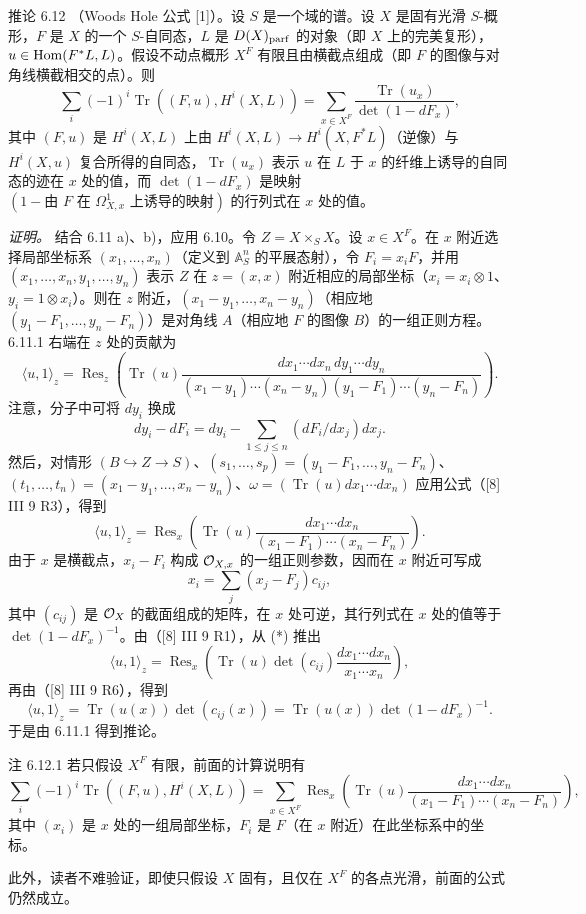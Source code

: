 \begin{statement}{推论 6.12}
（Woods Hole 公式 [1]）。设 $S$ 是一个域的谱。设 $X$ 是固有光滑 $S$-概形，$F$ 是 $X$ 的一个 $S$-自同态，$L$ 是 $D(X)_{\mathrm{parf}}$ 的对象（即 $X$ 上的完美复形），$u\in\operatorname{Hom}(F^*L,L)$。假设不动点概形 $X^F$ 有限且由横截点组成（即 $F$ 的图像与对角线横截相交的点）。则
\[
\sum_i(-1)^i\operatorname{Tr}((F,u),H^i(X,L))=
\sum_{x\in X^F}\frac{\operatorname{Tr}(u_x)}{\det(1-dF_x)},
\]
其中 $(F,u)$ 是 $H^i(X,L)$ 上由 $H^i(X,L)\to H^i(X,F^*L)$（逆像）与 $H^i(X,u)$ 复合所得的自同态，$\operatorname{Tr}(u_x)$ 表示 $u$ 在 $L$ 于 $x$ 的纤维上诱导的自同态的迹在 $x$ 处的值，而 $\det(1-dF_x)$ 是映射 $(1-\text{由 }F\text{ 在 }\Omega^1_{X,x}\text{ 上诱导的映射})$ 的行列式在 $x$ 处的值。

\emph{证明。} 结合 6.11 a)、b)，应用 6.10。令 $Z=X\times_S X$。设 $x\in X^F$。在 $x$ 附近选择局部坐标系 $(x_1,\ldots,x_n)$（定义到 $\mathbb A_S^n$ 的平展态射），令 $F_i=x_iF$，并用 $(x_1,\ldots,x_n,y_1,\ldots,y_n)$ 表示 $Z$ 在 $z=(x,x)$ 附近相应的局部坐标（$x_i=x_i\otimes1$、$y_i=1\otimes x_i$）。则在 $z$ 附近，$(x_1-y_1,\ldots,x_n-y_n)$（相应地 $(y_1-F_1,\ldots,y_n-F_n)$）是对角线 $A$（相应地 $F$ 的图像 $B$）的一组正则方程。6.11.1 右端在 $z$ 处的贡献为
\[
\langle u,1\rangle_z=
\operatorname{Res}_z\left(\operatorname{Tr}(u)\frac{dx_1\cdots dx_n\,dy_1\cdots dy_n}{(x_1-y_1)\cdots(x_n-y_n)(y_1-F_1)\cdots(y_n-F_n)}\right).
\]
注意，分子中可将 $dy_i$ 换成
\[
dy_i-dF_i=dy_i-\sum_{1\le j\le n}(dF_i/dx_j)dx_j.
\]
然后，对情形 $(B\hookrightarrow Z\to S)$、$(s_1,\ldots,s_p)=(y_1-F_1,\ldots,y_n-F_n)$、$(t_1,\ldots,t_n)=(x_1-y_1,\ldots,x_n-y_n)$、$\omega=(\operatorname{Tr}(u)dx_1\cdots dx_n)$ 应用公式（[8] III 9 R3），得到
\begin{equation}
\tag{*}
\langle u,1\rangle_z=
\operatorname{Res}_x\left(\operatorname{Tr}(u)\frac{dx_1\cdots dx_n}{(x_1-F_1)\cdots(x_n-F_n)}\right).
\end{equation}
由于 $x$ 是横截点，$x_i-F_i$ 构成 $\mathcal{O}_{X,x}$ 的一组正则参数，因而在 $x$ 附近可写成
\[
x_i=\sum_j(x_j-F_j)c_{ij},
\]
其中 $(c_{ij})$ 是 $\mathcal{O}_X$ 的截面组成的矩阵，在 $x$ 处可逆，其行列式在 $x$ 处的值等于 $\det(1-dF_x)^{-1}$。由（[8] III 9 R1），从 (*) 推出
\[
\langle u,1\rangle_z=\operatorname{Res}_x\left(\operatorname{Tr}(u)\det(c_{ij})\frac{dx_1\cdots dx_n}{x_1\cdots x_n}\right),
\]
再由（[8] III 9 R6），得到
\[
\langle u,1\rangle_z=\operatorname{Tr}(u(x))\det(c_{ij}(x))=\operatorname{Tr}(u(x))\det(1-dF_x)^{-1}.
\]
于是由 6.11.1 得到推论。
\end{statement}

\begin{statement}{注 6.12.1}
若只假设 $X^F$ 有限，前面的计算说明有
\[
\sum_i(-1)^i\operatorname{Tr}((F,u),H^i(X,L))=
\sum_{x\in X^F}\operatorname{Res}_x\left(\operatorname{Tr}(u)\frac{dx_1\cdots dx_n}{(x_1-F_1)\cdots(x_n-F_n)}\right),
\]
其中 $(x_i)$ 是 $x$ 处的一组局部坐标，$F_i$ 是 $F$（在 $x$ 附近）在此坐标系中的坐标。

此外，读者不难验证，即使只假设 $X$ 固有，且仅在 $X^F$ 的各点光滑，前面的公式仍然成立。
\end{statement}

